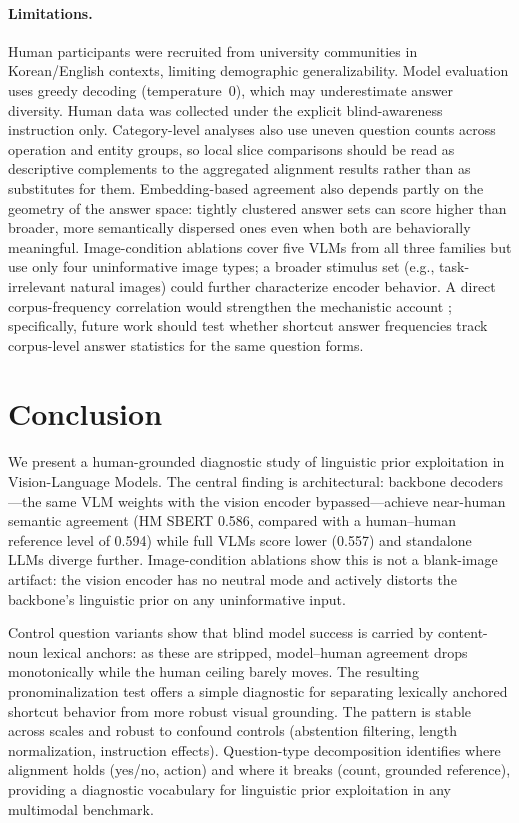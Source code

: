 \documentclass[letterpaper]{article}
\begin{document}
\paragraph{Limitations.}
Human participants were recruited from university communities in
Korean/English contexts, limiting demographic generalizability. Model
evaluation uses greedy decoding (temperature~0), which may underestimate
answer diversity. Human data was collected under the explicit blind-awareness instruction only.
Category-level analyses also use uneven question counts across operation and
entity groups, so local slice comparisons should be read as descriptive
complements to the aggregated alignment results rather than as substitutes
for them.
Embedding-based agreement also depends partly on the geometry of the answer
space: tightly clustered answer sets can score higher than broader, more
semantically dispersed ones even when both are behaviorally meaningful.
Image-condition ablations cover five VLMs from all three families
but use only four uninformative image types; a broader stimulus set
(e.g., task-irrelevant natural images) could further characterize encoder behavior.
A direct corpus-frequency correlation would strengthen the mechanistic
account \citep{mccoy2024embers}; specifically, future work should test whether
shortcut answer frequencies track corpus-level answer statistics for the same
question forms.

\section{Conclusion}

We present a human-grounded diagnostic study of linguistic prior
exploitation in Vision-Language Models. The central finding is
architectural: backbone decoders---the same VLM weights with the vision
encoder bypassed---achieve near-human semantic agreement (HM SBERT 0.586,
compared with a human--human reference level of 0.594) while full VLMs
score lower (0.557) and standalone LLMs diverge further. Image-condition
ablations show this is not a
blank-image artifact: the vision encoder has no neutral mode and actively
distorts the backbone's linguistic prior on any uninformative input.

Control question variants show that blind model success is carried by
content-noun lexical anchors: as these are stripped, model--human
agreement drops monotonically while the human ceiling barely moves. The
resulting pronominalization test offers a simple diagnostic for separating
lexically anchored shortcut behavior from more robust visual grounding. The
pattern is stable across scales and robust to confound controls
(abstention filtering, length normalization, instruction effects).
Question-type
decomposition identifies where alignment holds (yes/no, action) and
where it breaks (count, grounded reference), providing a diagnostic
vocabulary for linguistic prior exploitation in any multimodal benchmark.
\end{document}
